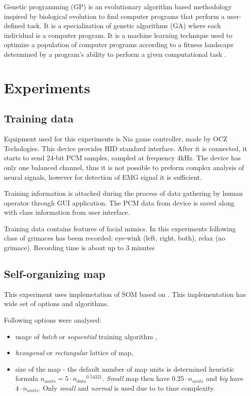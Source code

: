 \documentclass[a4paper]{IEEEtran}
\begin{document}
Genetic programming (GP) is an evolutionary algorithm based methodology 
inspired by biological evolution to find computer programs that perform 
a user-defined task. 
It is a specialization of genetic algorithms (GA) where each 
individual is a computer program. 
It is a machine learning technique used to optimize a population of 
computer programs according to a fitness landscape determined by a 
program's ability to perform a given computational task \cite{gawiki}.


\section{Experiments}
\subsection{Training data} %
Equipment used for this experiments is {Nia game controller}, made by 
{OCZ Techologies}. This device provides HID standard interface.
After it is connected, it starts to send 24-bit PCM samples, 
sampled at frequency 4kHz. The device has only one balanced channel, thus 
it is not possible to preform complex analysis of neural signals,
however for detection of EMG signal it is sufficient.

Training information is attached during the process of data gathering by human operator 
through GUI application.
The PCM data from device is saved along with class information from
user interface.

Training data contains features of facial mimics. In this experiments
following class of grimaces has beem recorded: eye-wink (left, right, both), 
relax (no grimace).
Recording time is about up to 3 minutes

\subsection{Self-organizing map}
This experiment uses implemetation of SOM based on \cite{somtoolbox}.
This implementation has wide set of options and algorithms.

Following options were analysed:
\begin{itemize}
	\item usage of \textit{batch} or \textit{sequential} training algorithm 
	\cite{somtoolbox},
	\item \textit{hexagonal} or \textit{rectangular} lattice of map,
	\item size of the map - the default number of map units is determined heuristic formula 
	$ n_{units} = 5\cdot {n_{data}}^{0.54321} $. \textit{Small} map then
	have $ 0.25\cdot n_{units} $ and \textit{big} have $ 4\cdot n_{units} $. Only
	\textit{small} and \textit{normal} is used due to to time complexity.
\end{itemize}
\end{document}

